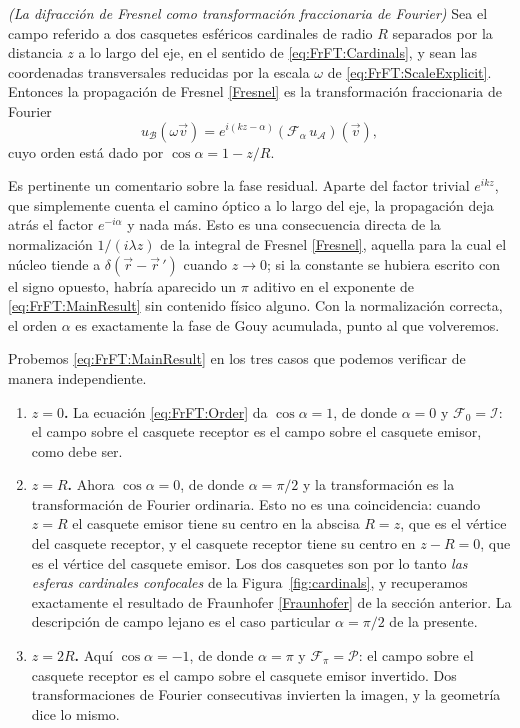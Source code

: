 			\begin{myteo}
				\textit{(La difracción de Fresnel como transformación fraccionaria de Fourier)} Sea el campo referido a dos casquetes esféricos cardinales de radio $R$ separados por la distancia $z$ a lo largo del eje, en el sentido de \eqref{eq:FrFT:Cardinals}, y sean las coordenadas transversales reducidas por la escala $\omega$ de \eqref{eq:FrFT:ScaleExplicit}. Entonces la propagación de Fresnel \eqref{Fresnel} es la transformación fraccionaria de Fourier
				\begin{equation}\label{eq:FrFT:MainResult}
					u_{\mathcal{B}}(\omega\vec{v}) = e^{i\left(kz - \alpha\right)}\left(\mathcal{F}_{\alpha}\,u_{\mathcal{A}}\right)(\vec{v}),
				\end{equation}
				cuyo orden está dado por $\cos\alpha = 1 - z/R$.
			\end{myteo}

			Es pertinente un comentario sobre la fase residual. Aparte del factor trivial $e^{ikz}$, que simplemente cuenta el camino óptico a lo largo del eje, la propagación deja atrás el factor $e^{-i\alpha}$ y nada más. Esto es una consecuencia directa de la normalización $1/(i\lambda z)$ de la integral de Fresnel \eqref{Fresnel}, aquella para la cual el núcleo tiende a $\delta(\vec{r}-\vec{r}\,')$ cuando $z\to0$; si la constante se hubiera escrito con el signo opuesto, habría aparecido un $\pi$ aditivo en el exponente de \eqref{eq:FrFT:MainResult} sin contenido físico alguno. Con la normalización correcta, el orden $\alpha$ es exactamente la fase de Gouy acumulada, punto al que volveremos.

			Probemos \eqref{eq:FrFT:MainResult} en los tres casos que podemos verificar de manera independiente.

			\begin{enumerate}
				\item \textbf{$z = 0$.} La ecuación \eqref{eq:FrFT:Order} da $\cos\alpha = 1$, de donde $\alpha = 0$ y $\mathcal{F}_{0} = \mathcal{I}$: el campo sobre el casquete receptor es el campo sobre el casquete emisor, como debe ser.
				\item \textbf{$z = R$.} Ahora $\cos\alpha = 0$, de donde $\alpha = \pi/2$ y la transformación es la transformación de Fourier ordinaria. Esto no es una coincidencia: cuando $z=R$ el casquete emisor tiene su centro en la abscisa $R = z$, que es el vértice del casquete receptor, y el casquete receptor tiene su centro en $z-R = 0$, que es el vértice del casquete emisor. Los dos casquetes son por lo tanto \textit{las esferas cardinales confocales} de la Figura~\ref{fig:cardinals}, y recuperamos exactamente el resultado de Fraunhofer \eqref{Fraunhofer} de la sección anterior. La descripción de campo lejano es el caso particular $\alpha = \pi/2$ de la presente.
				\item \textbf{$z = 2R$.} Aquí $\cos\alpha = -1$, de donde $\alpha = \pi$ y $\mathcal{F}_{\pi} = \mathcal{P}$: el campo sobre el casquete receptor es el campo sobre el casquete emisor invertido. Dos transformaciones de Fourier consecutivas invierten la imagen, y la geometría dice lo mismo.
			\end{enumerate}

